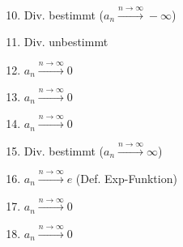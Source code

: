 \documentclass[12pt,answers]{exam}
\begin{document}
\begin{questions}
\begin{solution}
{\begin{enumerate}
\end{enumerate}}\parbox{0.5\textwidth}{\begin{enumerate}\setcounter{enumi}{9}
\item Div. bestimmt ($a_n\stackrel{n\to\infty}{\longrightarrow}-\infty$)
\item Div. unbestimmt
\item $a_n\stackrel{n\to\infty}{\longrightarrow}0$
\item $a_n\stackrel{n\to\infty}{\longrightarrow}0$
\item $a_n\stackrel{n\to\infty}{\longrightarrow}0$
\item Div. bestimmt ($a_n\stackrel{n\to\infty}{\longrightarrow}\infty$)
\item $a_n\stackrel{n\to\infty}{\longrightarrow}e$ (Def. Exp-Funktion)
\item $a_n\stackrel{n\to\infty}{\longrightarrow}0$
\item $a_n\stackrel{n\to\infty}{\longrightarrow}0$
\end{enumerate}}
\end{solution}





\end{questions}
\end{document}
